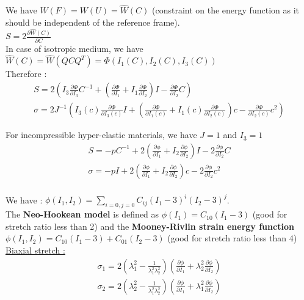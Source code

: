 \documentclass[../main.tex]{subfiles}
\begin{document}
We have $W(F) = W(U) = \hat{W}(C)$ (constraint on the energy function as it should be independent of the reference frame).\\

$S = 2 \frac{\partial \hat{W}(C)}{\partial C}$\\

In case of isotropic medium, we have $\hat{W}(C) = \hat{W}(QCQ^T) = \Phi(I_1(C), I_2(C), I_3(C))$\\

Therefore : \begin{equation}\begin{gathered}
    S = 2(I_3 \frac{\partial \Phi}{\partial I_3} C^{-1} + (\frac{\partial \Phi}{\partial I_1} + I_1 \frac{\partial \Phi}{\partial I_2})I - \frac{\partial \Phi}{\partial I_2} C)\\
    \sigma = 2J^{-1} (I_3(c) \frac{\partial \Phi}{\partial I_3(c)} I + (\frac{\partial \Phi}{\partial I_1(c)} + I_1(c) \frac{\partial \Phi}{\partial I_2(c)})c - \frac{\partial \Phi}{\partial I_2(c)} c^2)
    \end{gathered}
\end{equation}

For incompressible hyper-elastic materials, we have $J = 1$ and $I_3 = 1$\\
\begin{equation}\begin{gathered}
    S=  -pC^{-1} + 2(\frac{\partial \phi}{\partial I_1} + I_2 \frac{\partial \phi}{\partial I_2})I - 2\frac{\partial \phi}{\partial I_2} C\\
    \sigma = -pI + 2(\frac{\partial \phi}{\partial I_1} + I_2 \frac{\partial \phi}{\partial I_2})c - 2\frac{\partial \phi}{\partial I_2} c^2\\
    \end{gathered}
\end{equation}

We have : $\phi(I_1,I_2) = \sum_{i=0,j=0} C_{ij} (I_1-3)^i(I_2-3)^j$.\\
The \textbf{Neo-Hookean model} is defined as $\phi(I_1) = C_{10} (I_1-3)$ (good for stretch ratio less than 2) and the \textbf{Mooney-Rivlin strain energy function} $\phi(I_1,I_2) = C_{10} (I_1-3)+ C_{01}(I_2-3)$ (good for stretch ratio less than 4)\\

\quad \underline{Biaxial stretch :}\\
\begin{equation}
    \begin{gathered}
        \sigma_1 = 2(\lambda_1^2 - \frac{1}{\lambda_1^2 \lambda_2^2}) (\frac{\partial \phi}{\partial I_1} + \lambda_2^2 \frac{\partial \phi}{\partial I_2})\\
        \sigma_2 = 2(\lambda_2^2 - \frac{1}{\lambda_1^2 \lambda_2^2}) (\frac{\partial \phi}{\partial I_1} + \lambda_1^2 \frac{\partial \phi}{\partial I_2})\\
    \end{gathered}
\end{equation}
\end{document}
